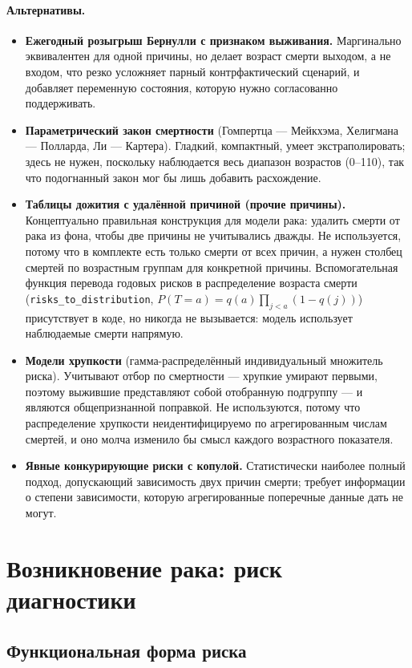 \documentclass[12pt,a4paper]{article}
\newcommand{\id}[1]{\texttt{#1}}
\newcommand{\alt}[1]{\paragraph{Альтернативы.} #1}
\begin{document}
\alt{\begin{itemize}[nosep]
  \item \textbf{Ежегодный розыгрыш Бернулли с признаком выживания.} Маргинально эквивалентен для одной
        причины, но делает возраст смерти выходом, а не входом, что резко усложняет парный контрфактический
        сценарий, и добавляет переменную состояния, которую нужно согласованно поддерживать.
  \item \textbf{Параметрический закон смертности} (Гомпертца --- Мейкхэма, Хелигмана --- Полларда,
        Ли --- Картера). Гладкий, компактный, умеет экстраполировать; здесь не нужен, поскольку наблюдается
        весь диапазон возрастов (0--110), так что подогнанный закон мог бы лишь добавить расхождение.
  \item \textbf{Таблицы дожития с удалённой причиной (прочие причины).} Концептуально правильная
        конструкция для модели рака: удалить смерти от рака из фона, чтобы две причины не учитывались
        дважды. Не используется, потому что в комплекте есть только смерти от всех причин, а нужен столбец
        смертей по возрастным группам для конкретной причины. Вспомогательная функция перевода годовых
        рисков в распределение возраста смерти (\id{risks\_to\_distribution},
        $P(T=a)=q(a)\prod_{j<a}(1-q(j))$) присутствует в коде, но никогда не вызывается: модель использует
        наблюдаемые смерти напрямую.
  \item \textbf{Модели хрупкости} (гамма-распределённый индивидуальный множитель риска). Учитывают отбор
        по смертности --- хрупкие умирают первыми, поэтому выжившие представляют собой отобранную
        подгруппу --- и являются общепризнанной поправкой. Не используются, потому что распределение
        хрупкости неидентифицируемо по агрегированным числам смертей, и оно молча изменило бы смысл каждого
        возрастного показателя.
  \item \textbf{Явные конкурирующие риски с копулой.} Статистически наиболее полный подход, допускающий
        зависимость двух причин смерти; требует информации о степени зависимости, которую агрегированные
        поперечные данные дать не могут.
\end{itemize}}

\section{Возникновение рака: риск диагностики}

\subsection{Функциональная форма риска}
\end{document}

